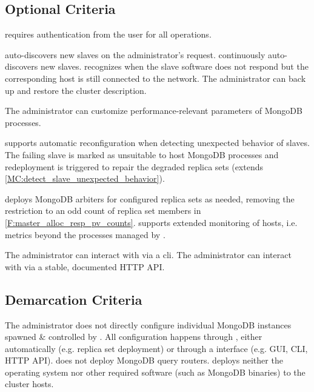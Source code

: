 \subsection{Optional Criteria}\label{OptionalCriteria}
\begin{description}
	
	 \mamid requires authentication from the user for all operations. 
	
	 \mamid auto-discovers new slaves on the administrator's request. \notdone
	 \mamid continuously auto-discovers new slaves. \notdone
	 \mamid recognizes when the slave software does not respond but the corresponding host is still 
	connected to the network.  \notdone
	 The administrator can back up and restore the cluster description. 
	
	 The administrator can customize performance-relevant parameters of MongoDB 
	processes. \notdone
	
	 \mamid supports automatic reconfiguration when detecting unexpected behavior of slaves. The failing 
	slave is marked as unsuitable to host MongoDB processes and redeployment is triggered to repair the degraded \glspl{replica 
	set} (extends \ref{MC:detect_slave_unexpected_behavior}). \notdone
	
	 \mamid deploys MongoDB arbiters for configured replica sets as needed, removing the 
	restriction to an odd count of replica set members in \ref{F:master_alloc_resp_pv_counts}.  \notdone
	 \mamid supports extended monitoring of hosts, i.e. metrics beyond the processes managed by \mamid.  
	\notdone
	
	 The administrator can interact with \mamid via a cli.  \notdone
	 The administrator can interact with \mamid via a stable, documented HTTP API.  \done
\end{description}

\subsection{Demarcation Criteria}
\begin{description}
	 The administrator does not directly configure individual MongoDB instances spawned \& controlled by \mamid. 
	All configuration happens through \mamid, either automatically (e.g. replica set deployment) or through a \mamid interface (e.g. 
	GUI, CLI, HTTP API). 
	 \mamid does not deploy MongoDB query routers.  \done
	 \mamid deploys neither the operating system nor other required software (such as MongoDB binaries) to the 
	cluster hosts.  \done
\end{description}